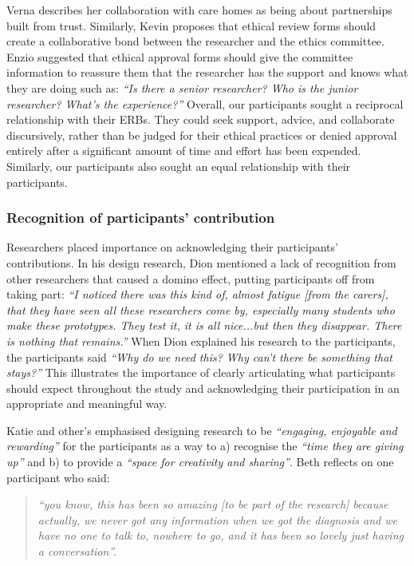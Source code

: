 Verna describes her collaboration with care homes as being about partnerships built from trust. Similarly, Kevin proposes that ethical review forms should create a collaborative bond between the researcher and the ethics committee. Enzio suggested that ethical approval forms should give the committee information to reassure them that the researcher has the support and knows what they are doing such as: \textit{“Is there a senior researcher? Who is the junior researcher? What’s the experience?”} Overall, our participants sought a reciprocal relationship with their ERBs. They could seek support, advice, and collaborate discursively, rather than be judged for their ethical practices or denied approval entirely after a significant amount of time and effort has been expended. Similarly, our participants also sought an equal relationship with their participants.

\subsubsection{Recognition of participants' contribution}
\label{Ethics:ThemeOnePartTwo}
Researchers placed importance on acknowledging their participants’ contributions. In his design research, Dion mentioned a lack of recognition from other researchers that caused a domino effect, putting participants off from taking part: \textit{“I noticed there was this kind of, almost fatigue [from the carers], that they have seen all these researchers come by, especially many students who make these prototypes. They test it, it is all nice...but then they disappear. There is nothing that remains.” }
When Dion explained his research to the participants, the participants said \textit{“Why do we need this? Why can’t there be something that stays?”} This illustrates the importance of clearly articulating what participants should expect throughout the study and acknowledging their participation in an appropriate and meaningful way. 

Katie and other’s emphasised designing research to be \textit{“engaging, enjoyable and rewarding”} for the participants as a way to a) recognise the \textit{“time they are giving up”} and b) to provide a \textit{“space for creativity and sharing”}. Beth reflects on one participant who said:

\begin{quote}
\textit{     “you know, this has been so amazing [to be part of the research] because actually, we never got any information when we got the diagnosis and we have no one to talk to, nowhere to go, and it has been so lovely just having a conversation”. 
}
\end{quote}


